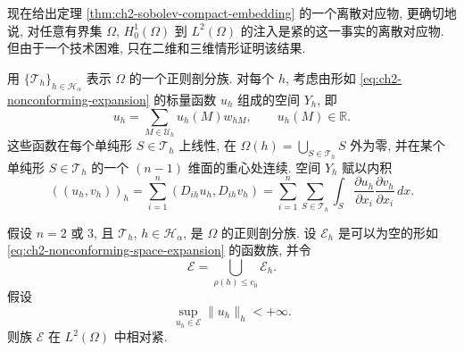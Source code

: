现在给出定理 \ref{thm:ch2-sobolev-compact-embedding} 的一个离散对应物, 更确切地说, 对任意有界集 $\Omega$, $H_0^1(\Omega)$ 到 $L^2(\Omega)$ 的注入是紧的这一事实的离散对应物. 但由于一个技术困难, 只在二维和三维情形证明该结果.

用 $\{\mathcal T_h\}_{h\in\mathcal H_\alpha}$ 表示 $\Omega$ 的一个正则剖分族. 对每个 $h$, 考虑由形如 \eqref{eq:ch2-nonconforming-expansion} 的标量函数 $u_h$ 组成的空间 $Y_h$, 即
\begin{equation}
u_h=\sum_{M\in\mathcal U_h}u_h(M)w_{hM},
\qquad u_h(M)\in\mathbb R.
\label{eq:ch2-nonconforming-space-expansion}
\end{equation}
这些函数在每个单纯形 $S\in\mathcal T_h$ 上线性, 在 $\Omega(h)=\bigcup_{S\in\mathcal T_h}S$ 外为零, 并在某个单纯形 $S\in\mathcal T_h$ 的一个 $(n-1)$ 维面的重心处连续. 空间 $Y_h$ 赋以内积
\begin{equation}
((u_h,v_h))_h
=\sum_{i=1}^{n}(D_{ih}u_h,D_{ih}v_h)
=\sum_{i=1}^{n}\sum_{S\in\mathcal T_h}
\int_S\frac{\partial u_h}{\partial x_i}
\frac{\partial v_h}{\partial x_i}\,dx.
\label{eq:ch2-nonconforming-discrete-inner-product}
\end{equation}

\hypertarget{chapter-02-page-147}{}
\begin{Theorem}
\label{thm:ch2-discrete-compactness-nonconforming}
假设 $n=2$ 或 $3$, 且 $\mathcal T_h$, $h\in\mathcal H_\alpha$, 是 $\Omega$ 的正则剖分族. 设 $\mathcal E_h$ 是可以为空的形如 \eqref{eq:ch2-nonconforming-space-expansion} 的函数族, 并令
\begin{equation}
\mathcal E=\bigcup_{\rho(h)\leq c_0}\mathcal E_h.
\label{eq:ch2-nonconforming-family-union}
\end{equation}
假设
\begin{equation}
\sup_{u_h\in\mathcal E}\lVert u_h\rVert_h<+\infty.
\label{eq:ch2-nonconforming-family-uniform-bound}
\end{equation}
则族 $\mathcal E$ 在 $L^2(\Omega)$ 中相对紧.
\end{Theorem}


